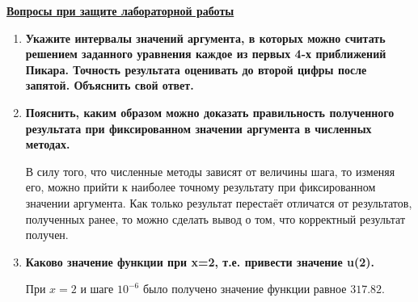 \underline{\textbf{Вопросы при защите лабораторной работы}}\\

\begin{enumerate}
\item \textbf{Укажите интервалы значений аргумента, в которых можно считать решением заданного уравнения каждое из первых 4-х приближений Пикара. Точность результата оценивать до второй цифры после запятой. Объяснить свой ответ.}

\item \textbf{Пояснить, каким образом можно доказать правильность полученного результата при фиксированном значении аргумента в численных методах.}

В силу того, что численные методы зависят от величины шага, то изменяя его, можно прийти к наиболее точному результату при фиксированном значении аргумента. Как только результат перестаёт отличатся от результатов, полученных ранее, то можно сделать вывод о том, что корректный результат получен.

\item \textbf{Каково значение функции при x=2, т.е. привести значение u(2).}

При $x = 2$ и шаге $10^{-6}$ было получено значение функции равное $317.82$.
\end{enumerate}